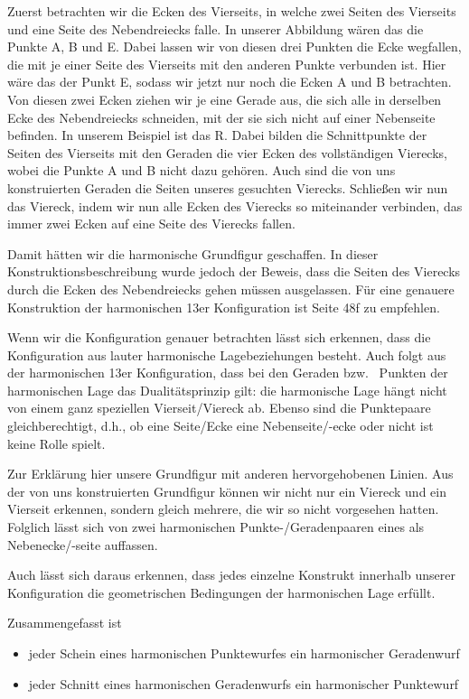 \documentclass[12pt,a4paper]{article}
\begin{document}
Zuerst betrachten wir die Ecken des Vierseits, in welche zwei Seiten des Vierseits und eine Seite des Nebendreiecks falle. In unserer Abbildung wären das die Punkte A, B und E. Dabei lassen wir von diesen drei Punkten die Ecke wegfallen, die mit je einer Seite des Vierseits mit den anderen Punkte verbunden ist. Hier wäre das der Punkt E, sodass wir jetzt nur noch die Ecken A und B betrachten. Von diesen zwei Ecken ziehen wir je eine Gerade aus, die sich alle in derselben Ecke des Nebendreiecks schneiden, mit der sie sich nicht auf einer Nebenseite befinden. In unserem Beispiel ist das R. Dabei bilden die Schnittpunkte der Seiten des Vierseits mit den Geraden die vier Ecken des vollständigen Vierecks, wobei die Punkte A und B nicht dazu gehören. Auch sind die von uns konstruierten Geraden die Seiten unseres gesuchten Vierecks. Schließen wir nun das Viereck, indem wir nun alle Ecken des Vierecks so miteinander verbinden, das immer zwei Ecken auf eine Seite des Vierecks fallen.

Damit hätten wir die harmonische Grundfigur geschaffen. In dieser Konstruktionsbeschreibung wurde jedoch der Beweis, dass die Seiten des Vierecks durch die Ecken des Nebendreiecks gehen müssen ausgelassen. Für eine genauere Konstruktion der harmonischen 13er Konfiguration ist \citep{projektiveGeometrie} Seite 48f zu empfehlen.

Wenn wir die Konfiguration genauer betrachten lässt sich erkennen, dass die Konfiguration aus lauter harmonische Lagebeziehungen besteht. Auch folgt aus der harmonischen 13er Konfiguration, dass bei den Geraden bzw.~ Punkten der harmonischen Lage das Dualitätsprinzip gilt: die harmonische Lage hängt nicht von einem ganz speziellen Vierseit/Viereck ab. Ebenso sind die Punktepaare gleichberechtigt, d.h., ob eine Seite/Ecke eine Nebenseite/-ecke oder nicht ist keine Rolle spielt.

Zur Erklärung hier unsere Grundfigur mit anderen hervorgehobenen Linien. Aus der von uns konstruierten Grundfigur können wir nicht nur ein Viereck und ein Vierseit erkennen, sondern gleich mehrere, die wir so nicht vorgesehen hatten. Folglich lässt sich von zwei harmonischen Punkte-/Geradenpaaren eines als Nebenecke/-seite auffassen.

Auch lässt sich daraus erkennen, dass jedes einzelne Konstrukt innerhalb unserer Konfiguration die geometrischen Bedingungen der harmonischen Lage erfüllt.

Zusammengefasst ist

\begin{itemize}
\item[] jeder Schein eines harmonischen Punktewurfes ein harmonischer Geradenwurf
\item[] jeder Schnitt eines harmonischen Geradenwurfs ein harmonischer Punktewurf
\end{itemize}
\end{document}
